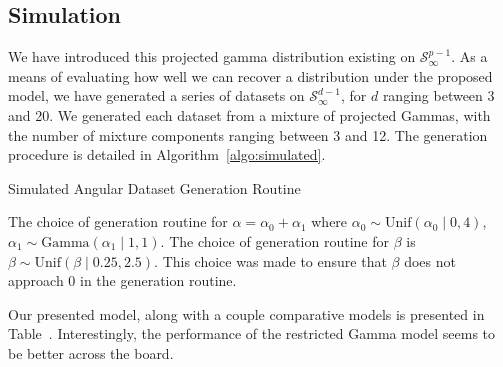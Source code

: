 \subsection{Simulation}
We have introduced this projected gamma distribution existing on $\mathcal{S}_{\infty}^{p-1}$.  As a
  means of evaluating how well we can recover a distribution under the proposed model, we have
  generated a series of datasets on $\mathcal{S}_{\infty}^{d-1}$, for $d$ ranging between 3 and 20.
  We generated each dataset from a mixture of projected Gammas, with the number of mixture components
  ranging between 3 and 12.  The generation procedure is detailed in Algorithm~\ref{algo:simulated}.
  \begin{algorithm}[H]
    \label{algo:simulated}
    \setAlgoLined
    \caption{Simulated Angular Dataset Generation Routine}
  \end{algorithm}
  The choice of generation routine for $\alpha = \alpha_0 + \alpha_1$ where
  $\alpha_0 \sim \text{Unif}(\alpha_0\mid 0,4)$, $\alpha_1\sim \text{Gamma}(\alpha_1\mid 1,1)$.
  The choice of generation routine for $\beta$ is $\beta\sim\text{Unif}(\beta\mid 0.25, 2.5)$.
  This choice was made to ensure that $\beta$ does not approach 0 in the generation routine.

Our presented model, along with a couple comparative models is presented in Table~.
  Interestingly, the performance of the restricted Gamma model seems to be better across the board.








